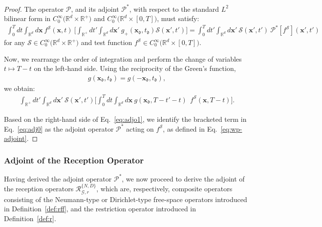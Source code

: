 \documentclass[11pt,reqno]{amsart}
\theoremstyle{remark}
\theoremstyle{italic_lemma}
\newcommand{\bx}{\boldsymbol{x}}
\newcommand{\fd}{\mathfrak{d}}
\begin{document}
\begin{proof}
The operator \( \mathcal{P} \), and its adjoint \( \mathcal{P}^* \), with respect to the standard \( L^2 \) bilinear form in \( C_0^{\infty} \big( \mathbb{R}^d \times \mathbb{R}^+ \big) \) and \( C_0^{\infty} \big( \mathbb{R}^d \times [0,T] \big) \), must satisfy:
\begin{align}  \label{eq:adjo1}
\int_0^T dt \int_{\mathbb{R}^d} d \bx  \   f^{\mathcal{S}}(\bx,t) \  \bigg[ \int_{\mathbb{R}^+} dt' \int_{\mathbb{R}^d} d \bx' \  g_+(\bx_{\fd}, t_{\fd} ) \mathcal{S}(\bx', t') \bigg]  
=  \int_0^T dt' \int_{\mathbb{R}^d} d \bx'  \   \mathcal{S}(\bx',t')  \
 \mathcal{P}^*\left[f^{\mathcal{S}}\right](\bx', t' ) 
\end{align}
for any \( \mathcal{S} \in C_0^{\infty} \big( \mathbb{R}^d \times \mathbb{R}^+ \big) \) and test function \( f^{\mathcal{S}} \in C_0^{\infty} \big( \mathbb{R}^d \times [0,T] \big) \). 


Now, we rearrange the order of integration and perform the change of variables \( t \mapsto T - t \) on the left-hand side. Using the reciprocity of the Green's function,
\begin{align}  \label{eq:reciprocity}
    g(\bx_{\fd}, t_{\fd}) = g(-\bx_{\fd}, t_{\fd}),
\end{align}
we obtain:
\begin{align} \label{eq:adj0}
\int_{\mathbb{R}^+} dt' \int_{\mathbb{R}^d} d \bx'  \   \mathcal{S}(\bx', t') \bigg[  \int_0^T dt \int_{\mathbb{R}^d} d \bx  \  g(\bx_{\fd}, T - t' - t ) \  \ f^{\mathcal{S}}(\bx, T - t)  \bigg].
\end{align}

Based on the right-hand side of Eq.~\eqref{eq:adjo1}, we identify the bracketed term in Eq.~\eqref{eq:adj0} as the adjoint operator \( \mathcal{P}^* \) acting on \( f^{\mathcal{S}} \), as defined in Eq.~\eqref{eq:wp-adjoint}.
\end{proof}


\subsubsection{Adjoint of the Reception Operator} 

Having derived the adjoint operator \( \mathcal{P}^* \), we now proceed to derive the adjoint of the reception operators \( \mathcal{R}_{\mathcal{G},r}^{\{N,D\}} \), which are, respectively, composite operators consisting of the Neumann-type or Dirichlet-type free-space operators introduced in Definition~\ref{def:rff}, and the restriction operator introduced in Definition~\ref{def:r}. 
\end{document}
